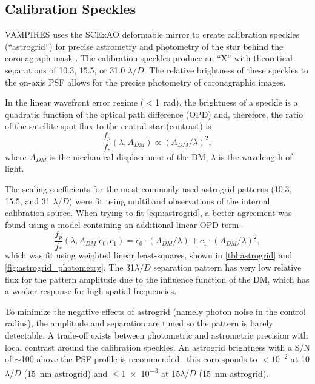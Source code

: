 \subsection{Calibration Speckles}\label{sec:astrogrid}

VAMPIRES uses the SCExAO deformable mirror to create calibration speckles (``astrogrid'') for precise astrometry and photometry of the star behind the coronagraph mask \citep{sahoo_precision_2020}. The calibration speckles produce an ``X'' with theoretical separations of 10.3, 15.5, or 31.0 $\lambda/D$. The relative brightness of these speckles to the on-axis PSF allows for the precise photometry of coronagraphic images.

In the linear wavefront error regime ($<$\SI{1}{\radian}), the brightness of a speckle is a quadratic function of the optical path difference (OPD) \citep{jovanovic_artificial_2015,currie_laboratory_2018,chen_post-processing_2023} and, therefore, the ratio of the satellite spot flux to the central star (contrast) is
\begin{equation}
    \label{eqn:astrogrid}
    \frac{f_p}{f_*}\left( \lambda, A_{DM}\right) \propto \left(A_{DM} / \lambda\right)^2,
\end{equation}
where $A_{DM}$ is the mechanical displacement of the DM, $\lambda$ is the wavelength of light. 

The scaling coefficients for the most commonly used astrogrid patterns (10.3, 15.5, and 31 $\lambda/D$) were fit using multiband observations of the internal calibration source. When trying to fit \autoref{eqn:astrogrid}, a better agreement was found using a model containing an additional linear OPD term--
\begin{equation}
    \label{eqn:astrogridmod}
    \frac{f_p}{f_*}\left( \lambda, A_{DM} | c_0, c_1 \right) = c_0 \cdot \left(A_{DM} / \lambda\right) + c_1 \cdot \left(A_{DM} / \lambda\right)^2,
\end{equation}
which was fit using weighted linear least-squares, shown in \autoref{tbl:astrogrid} and \autoref{fig:astrogrid_photometry}. The 31$\lambda/D$ separation pattern has very low relative flux for the pattern amplitude due to the influence function of the DM, which has a weaker response for high spatial frequencies.

To minimize the negative effects of astrogrid (namely photon noise in the control radius), the amplitude and separation are tuned so the pattern is barely detectable. A trade-off exists between photometric and astrometric precision with local contrast around the calibration speckles. An astrogrid brightness with a S/N of $\sim$100 above the PSF profile is recommended-- this corresponds to $<10^{-2}$ at 10$\lambda/D$ (\SI{15}{\nano\meter} astrogrid) and $<$\num{1e-3} at 15$\lambda/D$ (\SI{15}{\nano\meter} astrogrid).

